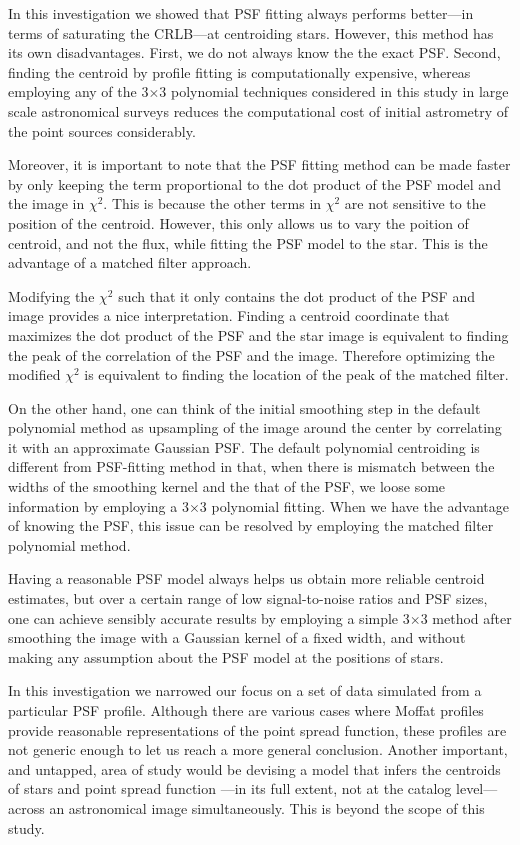 \documentclass[12pt, preprint]{aastex}
\begin{document}
In this investigation we showed that PSF fitting always performs better---in terms of saturating the CRLB---at centroiding stars.
However, this method has its own disadvantages. First, we do not always know the the exact PSF. Second, finding 
the centroid by profile fitting is computationally expensive, whereas employing any of the 3$\times$3 polynomial techniques 
considered in this study in large scale astronomical surveys reduces the computational cost
of initial astrometry of the point sources considerably. 

Moreover, it is important to note that the PSF fitting method can be made faster by only keeping the 
term proportional to the dot product of the PSF model and the image in $\chi^2$. This is because 
the other terms in $\chi^{2}$ are not sensitive to the position of the centroid. However, this only allows
us to vary the poition of centroid, and not the flux, while fitting the PSF model
to the star. This is the advantage of a matched filter approach.

Modifying the $\chi^2$ such that it only contains the dot product of the PSF and image 
provides a nice interpretation. Finding a centroid coordinate that maximizes the dot product 
of the PSF and the star image is equivalent to finding the peak of the 
correlation of the PSF and the image. Therefore optimizing the modified $\chi^2$ is equivalent to finding the 
location of the peak of the matched filter. 
 
On the other hand, one can think of the initial smoothing step in the default polynomial method 
as upsampling of the image around the center by correlating it with an approximate Gaussian PSF. 
The default polynomial centroiding is different from PSF-fitting method in that, when there is mismatch between the
widths of the smoothing kernel and the that of the PSF, we loose some information by employing a 3$\times$3 polynomial fitting.
When we have the advantage of knowing the PSF, this issue can be resolved by employing the matched filter polynomial method.

Having a reasonable PSF model always helps us obtain more reliable centroid estimates, but
over a certain range of low signal-to-noise ratios and PSF sizes, one can achieve sensibly 
accurate results by employing a simple 3$\times$3 method after smoothing the image with 
a Gaussian kernel of a fixed width, and without making any assumption about the PSF model 
at the positions of stars.

In this investigation we narrowed our focus on a set of data simulated from a particular
PSF profile. Although there are various cases where Moffat profiles provide reasonable
representations of the point spread function, these profiles are not generic enough to let us
reach a more general conclusion. Another important, and untapped, area of study
would be devising a model that infers the centroids of stars and point spread function
---in its full extent, not at the catalog level---across an astronomical image simultaneously.
This is beyond the scope of this study. 
\end{document}
